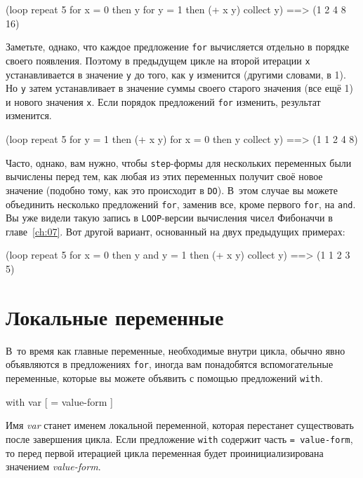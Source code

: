 \begin{myverb}
(loop repeat 5 
      for x = 0 then y
      for y = 1 then (+ x y)
      collect y) ==> (1 2 4 8 16)
\end{myverb}

Заметьте, однако, что каждое предложение \lstinline{for} вычисляется отдельно в порядке своего
появления. Поэтому в предыдущем цикле на второй итерации \lstinline{x} устанавливается в
значение \lstinline{y} до того, как \lstinline{y} изменится (другими словами, в 1). Но \lstinline{y}
затем устанавливает в значение суммы своего старого значения (все ещё 1) и нового значения
\lstinline{x}. Если порядок предложений \lstinline{for} изменить, результат изменится.

\begin{myverb}
(loop repeat 5
      for y = 1 then (+ x y)
      for x = 0 then y
      collect y) ==> (1 1 2 4 8)
\end{myverb}

Часто, однако, вам нужно, чтобы \lstinline{step}-формы для нескольких переменных были вычислены перед
тем, как любая из этих переменных получит своё новое значение (подобно тому, как это
происходит в \lstinline{DO}). В~этом случае вы можете объединить несколько предложений
\lstinline{for}, заменив все, кроме первого \lstinline{for}, на \lstinline{and}. Вы уже видели такую запись
в \lstinline{LOOP}-версии вычисления чисел Фибоначчи в главе~\ref{ch:07}. Вот другой вариант,
основанный на двух предыдущих примерах:

\begin{myverb}
(loop repeat 5 
      for x = 0 then y
      and y = 1 then (+ x y)
      collect y) ==> (1 1 2 3 5)
\end{myverb}

\section{Локальные переменные}

В~то время как главные переменные, необходимые внутри цикла, обычно явно объявляются в
предложениях \lstinline{for}, иногда вам понадобятся вспомогательные переменные, которые вы
можете объявить с помощью предложений \lstinline{with}.

\begin{myverb}
with var [ = value-form ]
\end{myverb}

Имя \textit{var} станет именем локальной переменной, которая перестанет существовать после
завершения цикла. Если предложение \lstinline{with} содержит часть \lstinline{= value-form}, то
перед первой итерацией цикла переменная будет проинициализирована значением
\textit{value-form}.

